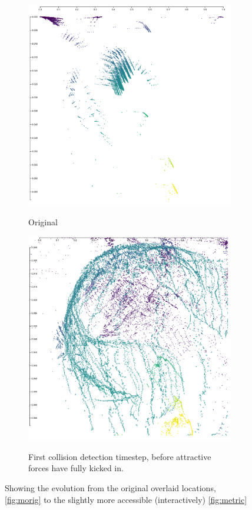 \begin{figure}[H]
\begin{subfigure}{.5\textwidth}
  \centering
  \includegraphics[width=\textwidth]{fig/metric-1.png}
  \label{fig:morig}
  \caption{Original}
\end{subfigure}%
\begin{subfigure}{.5\textwidth}
  \centering
  \includegraphics[width=\textwidth]{fig/metric0.png}
  \label{fig:m1}
  \caption{First collision detection timestep, before attractive forces have fully kicked in.}
\end{subfigure}

\caption{Showing the evolution from the original overlaid locations, \autoref{fig:morig} to the slightly more accessible (interactively) \autoref{fig:metric}}
\end{figure}


